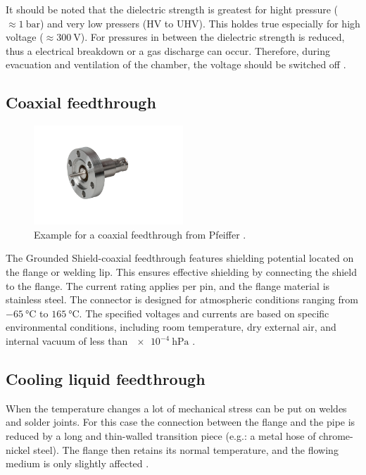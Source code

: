It should be noted that the dielectric strength is greatest for hight pressure ($\approx 1~\si{\bar}$) and very low pressers (HV to UHV).
This holdes true especially for high voltage ($\approx 300~\si{\volt}$).
For pressures in between the dielectric strength is reduced, thus a electrical breakdown or a gas discharge can occur.
Therefore, during evacuation and ventilation of the chamber, the voltage should be switched off \cite{Wutz2000}.

\subsection{Coaxial feedthrough}

\begin{figure}[H]
    \centering
    \includegraphics[width=0.5\textwidth]{sections/imges/ports/coaxial_feedthrough_pfeiffer.png}
    \caption{Example for a coaxial feedthrough from Pfeiffer \cite{pfeiffer_coaxial}.}
    \label{fig:coaxial_feedthrough}
\end{figure}

The Grounded Shield-coaxial feedthrough features shielding potential located on the flange or welding lip.
This ensures effective shielding by connecting the shield to the flange.
The current rating applies per pin, and the flange material is stainless steel.
The connector is designed for atmospheric conditions ranging from $\SI{-65}{\degreeCelsius}$ to $\SI{165}{\degreeCelsius}$.
The specified voltages and currents are based on specific environmental conditions, including room temperature, dry external air, and internal vacuum of less than $\SI{e-4}{\hecto\pascal}$ \cite{pfeiffer_coaxial}.


\subsection{Cooling liquid feedthrough}
When the temperature changes a lot of mechanical stress can be put on weldes and solder joints. For this case the connection between the flange and the pipe is reduced by a long and thin-walled transition piece (e.g.: a metal hose of chrome-nickel steel).
The flange then retains its normal temperature, and the flowing medium is only slightly affected \cite{Wutz2000}.

